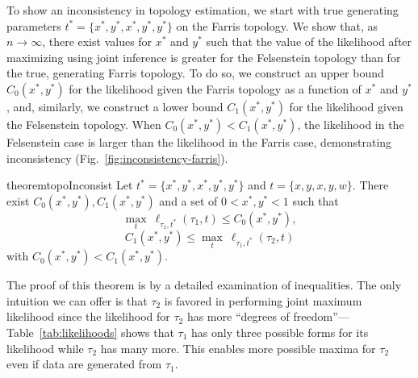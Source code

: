 \documentclass{article}
\newcommand{\nCols}{n}
\begin{document}
To show an inconsistency in topology estimation, we start with true generating parameters $t^*=\{x^*, y^*, x^*, y^*, y^*\}$ on the Farris topology.
We show that, as $\nCols\rightarrow\infty$, there exist values for $x^*$ and $y^*$ such that the value of the likelihood after maximizing using joint inference is greater for the Felsenstein topology than for the true, generating Farris topology.
To do so, we construct an upper bound $C_0(x^*, y^*)$ for the likelihood given the Farris topology as a function of $x^*$ and $y^*$, and, similarly, we construct a lower bound $C_1(x^*, y^*)$ for the likelihood given the Felsenstein topology.
When $C_0(x^*, y^*) < C_1(x^*, y^*)$, the likelihood in the Felsenstein case is larger than the likelihood in the Farris case, demonstrating inconsistency (Fig.~\ref{fig:inconsistency-farris}).
\begin{restatable}{theorem}{topoInconsist}
Let $t^*=\{x^*, y^*, x^*, y^*, y^*\}$ and $t=\{x, y, x, y, w\}$.
There exist $C_0(x^*, y^*), C_1(x^*, y^*)$ and a set of $0 < x^*, y^* < 1$ such that
$$
\max_{t} \ \ell_{\tau_1,t^*}(\tau_1, t) \le C_0(x^*, y^*),
$$
$$
C_1(x^*, y^*) \le \max_{t} \ \ell_{\tau_1,t^*}(\tau_2, t)
$$
with $C_0(x^*, y^*) < C_1(x^*, y^*)$.
\end{restatable}
The proof of this theorem is by a detailed examination of inequalities.
The only intuition we can offer is that $\tau_2$ is favored in performing joint maximum likelihood since the likelihood for $\tau_2$ has more ``degrees of freedom''---Table~\ref{tab:likelihoods} shows that $\tau_1$ has only three possible forms for its likelihood while $\tau_2$ has many more.
This enables more possible maxima for $\tau_2$ even if data are generated from $\tau_1$.
\end{document}
